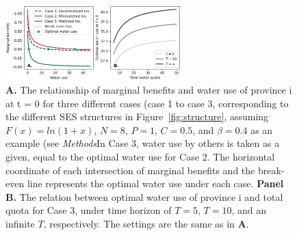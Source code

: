 \documentclass{nsr}
\begin{document}
\begin{table}[!ht]
	\centering
	\caption{Summary of marginal returns and marginal costs for each case }
	\centering
	\footnotesize{}
	\label{tab:cases}
\end{table}

\begin{figure}[!ht]
    \centering
    \includegraphics[width=16pc]{../../../figs/outputs/economic_model.jpg}
	\caption{
		\textbf{A.} The relationship of marginal benefits and water use of province i at t = 0 for three different cases (case 1 to case 3, corresponding to the different SES structures in Figure~\ref{fig:structure}, assuming $F(x)=ln(1+x)$, $N=8$, $P=1$, $C=0.5$, and $\beta=0.4$ as an example  (see \textit{Methods}In Case 3, water use by others is taken as a given, equal to the optimal water use for Case 2. The horizontal coordinate of each intersection of marginal benefits and the break-even line represents the optimal water use under each case.
		\textbf{Panel B.} The relation between optimal water use of province i and total quota for Case 3, under time horizon of $T=5$, $T=10$, and an infinite $T$, respectively. The settings are the same as in \textbf{A}.
	}
	\label{fig:economic_model}
\end{figure}
\end{document}
